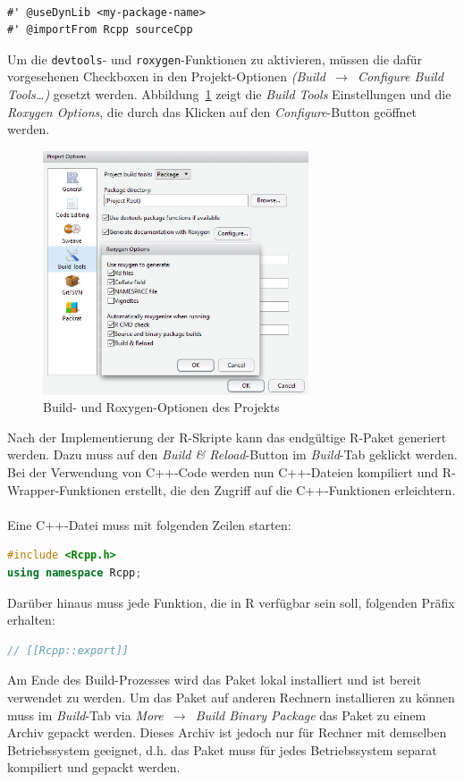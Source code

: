 \\
\begin{lstlisting}[caption=Notwendige \texttt{roxygen}-Kommentare bei der Verwendung von C++-Code, label={lst:rcppNamespace}, float=!th]
#' @useDynLib <my-package-name>
#' @importFrom Rcpp sourceCpp
\end{lstlisting}
Um die \texttt{devtools}- und \texttt{roxygen}-Funktionen zu aktivieren, müssen die dafür vorgesehenen Checkboxen in den Projekt-Optionen \emph{(Build~$\rightarrow$~Configure Build Tools\dots)} gesetzt werden. Abbildung~\ref{abb:build_roxygen_options} zeigt die \emph{Build Tools} Einstellungen und die \emph{Roxygen Options}, die durch das Klicken auf den \emph{Configure}-Button geöffnet werden.
\\
\begin{figure}[th]
	\centering
	\includegraphics[width=0.7\textwidth]{abbildungen/build_config}
	\caption{Build- und Roxygen-Optionen des Projekts}
	\label{abb:build_roxygen_options}
\end{figure}
Nach der Implementierung der R-Skripte kann das endgültige R-Paket generiert werden. Dazu muss auf den \emph{Build \& Reload}-Button im \emph{Build}-Tab geklickt werden. Bei der Verwendung von C++-Code werden nun C++-Dateien kompiliert und R-Wrapper-Funktionen erstellt, die den Zugriff auf die C++-Funktionen erleichtern.
\\
\\
Eine C++-Datei muss mit folgenden Zeilen starten:
\begin{lstlisting}[language=C++, numbers=none, basicstyle=\ttfamily]
#include <Rcpp.h>
using namespace Rcpp;
\end{lstlisting}
Darüber hinaus muss jede Funktion, die in R verfügbar sein soll, folgenden Präfix erhalten:
\begin{lstlisting}[language=C++, numbers=none, basicstyle=\ttfamily]
// [[Rcpp::export]]
\end{lstlisting}
Am Ende des Build-Prozesses wird das Paket lokal installiert und ist bereit verwendet zu werden. Um das Paket auf anderen Rechnern installieren zu können muss im \emph{Build}-Tab via \emph{More~$\rightarrow$~Build Binary Package} das Paket zu einem Archiv gepackt werden. Dieses Archiv ist jedoch nur für Rechner mit demselben Betriebssystem geeignet, d.h. das Paket muss für jedes Betriebssystem separat kompiliert und gepackt werden.

